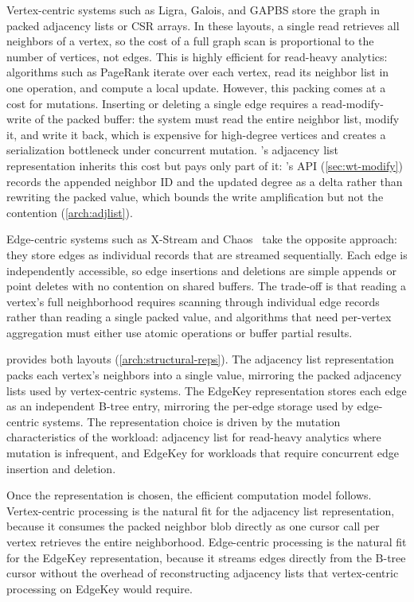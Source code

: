 Vertex-centric systems such as Ligra, Galois, and GAPBS store the graph in packed adjacency lists or CSR arrays.
In these layouts, a single read retrieves all neighbors of a vertex, so the cost of a full graph scan is proportional to the number of vertices, not edges.
This is highly efficient for read-heavy analytics: algorithms such as PageRank iterate over each vertex, read its neighbor list in one operation, and compute a local update.
However, this packing comes at a cost for mutations.
Inserting or deleting a single edge requires a read-modify-write of the packed buffer: the system must read the entire neighbor list, modify it, and write it back, which is expensive for high-degree vertices and creates a serialization bottleneck under concurrent mutation.
\project{}'s adjacency list representation inherits this cost but pays only part of it: \wt{}'s  API (\autoref{sec:wt-modify}) records the appended neighbor ID and the updated degree as a delta rather than rewriting the packed value, which bounds the write amplification but not the contention (\autoref{arch:adjlist}).

Edge-centric systems such as X-Stream and Chaos~\cite{royChaos2015} take the opposite approach: they store edges as individual records that are streamed sequentially.
Each edge is independently accessible, so edge insertions and deletions are simple appends or point deletes with no contention on shared buffers.
The trade-off is that reading a vertex's full neighborhood requires scanning through individual edge records rather than reading a single packed value, and algorithms that need per-vertex aggregation must either use atomic operations or buffer partial results.

\project{} provides both layouts (\autoref{arch:structural-reps}).
The adjacency list representation packs each vertex's neighbors into a single \wt{} value, mirroring the packed adjacency lists used by vertex-centric systems.
The EdgeKey representation stores each edge as an independent B-tree entry, mirroring the per-edge storage used by edge-centric systems.
The representation choice is driven by the mutation characteristics of the workload: adjacency list for read-heavy analytics where mutation is infrequent, and EdgeKey for workloads that require concurrent edge insertion and deletion.

Once the representation is chosen, the efficient computation model follows.
Vertex-centric processing is the natural fit for the adjacency list representation, because it consumes the packed neighbor blob directly as one cursor call per vertex retrieves the entire neighborhood.
Edge-centric processing is the natural fit for the EdgeKey representation, because it streams edges directly from the B-tree cursor without the overhead of reconstructing adjacency lists that vertex-centric processing on EdgeKey would require.

